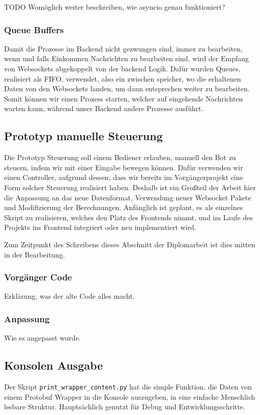 TODO Womöglich weiter beschreiben, wie asyncio genau funktioniert?

\subsubsection{Queue Buffers}
Damit die Prozesse im Backend nicht gezwungen sind, immer zu bearbeiten, 
wenn und falls Einkommen Nachrichten zu bearbeiten sind, 
wird der Empfang von Websockets abgekoppelt von der backend Logik.
Dafür wurden Queues, realisiert als FIFO, verwendet, also ein zwischen speicher, 
wo die erhaltenen Daten von den Websockets landen, 
um dann entsprechen weiter zu bearbeiten.
% 
Somit können wir einen Prozess starten, welcher auf eingehende Nachrichten warten kann,
während unser Backend andere Prozesse ausführt.

\subsection{Prototyp manuelle Steuerung}
Die Prototyp Steuerung soll einem Bediener erlauben, manuell den Bot zu steuern,
indem wir mit einer Eingabe bewegen können. 
% 
Dafür verwenden wir einen Controller, 
aufgrund dessen, dass wir bereits im Vorgängerprojekt
eine Form solcher Steuerung realisiert haben. 
Deshalb ist ein Großteil der Arbeit hier die Anpassung an das neue Datenformat, 
Verwendung neuer Websocket Pakete und Modifizierung der Berechnungen.
% 
Anfänglich ist geplant, es als einzelnes Skript zu realisieren, 
welches den Platz des Frontends nimmt, 
und im Laufe des Projekts ins Frontend integriert oder neu implementiert wird.

Zum Zeitpunkt des Schreibens dieses Abschnitt der Diplomarbeit 
ist dies mitten in der Bearbeitung.
\subsubsection{Vorgänger Code}
Erklärung, was der alte Code alles macht.
\subsubsection{Anpassung}
Wie es angepasst wurde.

\subsection{Konsolen Ausgabe}
Der Skript \texttt{print\_wrapper\_content.py} hat die simple Funktion, 
die Daten von einem Protobuf Wrapper in die Konsole auszugeben, 
in eine einfache Menschlich lesbare Struktur. 
Hauptsächlich genutzt für Debug und Entwicklungsschritte.

